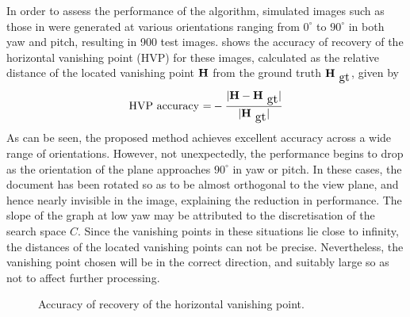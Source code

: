 In order to assess the performance of the algorithm, simulated images such as
those in  were generated at various orientations ranging from
$0^\circ$ to $90^\circ$ in both yaw and pitch, resulting in 900 test images. 
 shows the accuracy of recovery of the horizontal vanishing
point (HVP) for these images, 
calculated as the relative distance of the located vanishing point ${ \bf H }$ 
from the ground truth $\myvec{H}_{\mbox{\small gt}}$, given by
\begin{equation} 
\mbox{HVP accuracy =} -\frac{|\myvec{H}-\myvec{H}_{\mbox{\small gt}}|}{|\myvec{H}_{\mbox{\small gt}}|} \label{Haccuracy}
\end{equation}
As can be seen, the proposed method achieves excellent accuracy across a wide
range of orientations. However, not unexpectedly, the performance begins to
drop as the orientation of the plane approaches $90^\circ$ in yaw or pitch. In
these cases, the document has been rotated so as to be almost orthogonal to the
view plane, and hence nearly invisible in the image, explaining the reduction
in performance. The slope of the graph at low yaw may be attributed to the
discretisation of the search space $C$. Since the vanishing points in these
situations lie close to infinity, the distances of the located vanishing points
can not be precise. Nevertheless, the vanishing point chosen will be in the
correct direction, and suitably large so as not to affect further processing.


\begin{figure}[ht]
\centering
\begin{center}
\hspace*{4mm}
\end{center}
\caption{Accuracy of recovery of the horizontal vanishing point.}
\end{figure}




